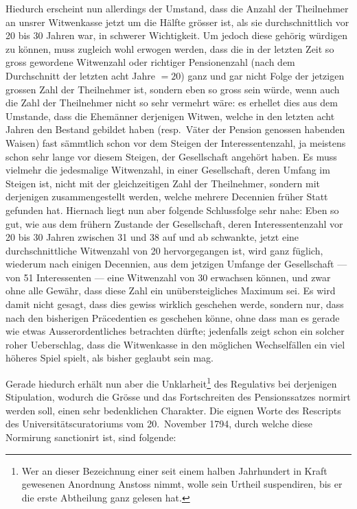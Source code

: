 \documentclass[12pt,a4paper]{article}
\begin{document}
Hiedurch erscheint nun allerdings der Umstand, dass die Anzahl der Theilnehmer an unsrer Witwenkasse jetzt um die H\"alfte gr\"osser ist, als sie durchschnittlich vor 20 bis 30 Jahren war, in schwerer Wichtigkeit. Um jedoch diese geh\"orig w\"urdigen zu k\"onnen, muss zugleich wohl erwogen werden, dass die in der letzten Zeit so gross gewordene Witwenzahl oder richtiger Pensionenzahl (nach dem Durchschnitt der letzten acht Jahre $= 20$) ganz und gar nicht Folge der jetzigen grossen Zahl der Theilnehmer ist, sondern eben so gross sein w\"urde, wenn auch die Zahl der Theilnehmer nicht so sehr vermehrt w\"are: es erhellet dies aus dem Umstande, dass die Ehem\"anner derjenigen Witwen, welche in den letzten acht Jahren den Bestand gebildet haben (resp.\ V\"ater der Pension genossen habenden Waisen) fast s\"ammtlich schon vor dem Steigen der Interessentenzahl, ja meistens schon sehr lange vor diesem Steigen, der Gesellschaft angeh\"ort haben. Es muss vielmehr die jedesmalige Witwenzahl, in einer Gesellschaft, deren Umfang im Steigen ist, nicht mit der gleichzeitigen Zahl der Theilnehmer, sondern mit derjenigen zusammengestellt werden, welche mehrere Decennien fr\"uher Statt gefunden hat. Hiernach liegt nun aber folgende Schlussfolge sehr nahe: Eben so gut, wie aus dem fr\"uhern Zustande der Gesellschaft, deren Interessentenzahl vor 20 bis 30 Jahren zwischen 31 und 38 auf und ab schwankte, jetzt eine durchschnittliche Witwenzahl von 20 hervorgegangen ist, wird ganz f\"uglich, wiederum nach einigen Decennien, aus dem jetzigen Umfange der Gesellschaft --- von 51 Interessenten --- eine Witwenzahl von 30 erwachsen k\"onnen, und zwar ohne alle Gew\"ahr, dass diese Zahl ein un\"ubersteigliches Maximum sei. Es wird damit nicht gesagt, dass dies gewiss wirklich geschehen werde, sondern nur, dass nach den bisherigen Pr\"acedentien es geschehen k\"onne, ohne dass man es gerade wie etwas Ausserordentliches betrachten d\"urfte; jedenfalls zeigt schon ein solcher roher Ueberschlag, dass die Witwenkasse in den m\"oglichen Wechself\"allen ein viel h\"oheres Spiel spielt, als bisher geglaubt sein mag.

Gerade hiedurch erh\"alt nun aber die Unklarheit\footnote{Wer an dieser Bezeichnung einer seit einem halben Jahrhundert in Kraft gewesenen Anordnung Anstoss nimmt, wolle sein Urtheil suspendiren, bis er die erste Abtheilung ganz gelesen hat.} des Regulativs bei derjenigen Stipulation, wodurch die Gr\"osse und das Fortschreiten des Pensionssatzes normirt werden soll, einen sehr bedenklichen Charakter. Die eignen Worte des Rescripts des Universit\"atscuratoriums vom 20.\ November 1794, durch welche diese Normirung sanctionirt ist, sind folgende:
\end{document}
